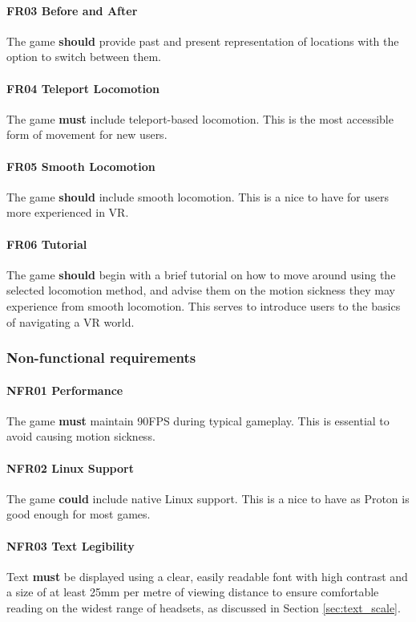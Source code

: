 \documentclass[sigconf,authordraft]{acmart}
\begin{document}
\paragraph{FR03 Before and After}
The game \textbf{should} provide past and present representation of locations
with the option to switch between them.

\paragraph{FR04 Teleport Locomotion}
The game \textbf{must} include teleport-based locomotion. This is the most
accessible form of movement for new users.

\paragraph{FR05 Smooth Locomotion}
The game \textbf{should} include smooth locomotion. This is a nice to have for
users more experienced in VR.

\paragraph{FR06 Tutorial}
The game \textbf{should} begin with a brief tutorial on how to move around
using the selected locomotion method, and advise them on the motion sickness
they may experience from smooth locomotion. This serves to introduce users to
the basics of navigating a VR world.

\subsubsection{Non-functional requirements}

\paragraph{\label{sec:nfr_performance}NFR01 Performance}
The game \textbf{must} maintain 90FPS during typical gameplay. This is essential
to avoid causing motion sickness.

\paragraph{NFR02 Linux Support}
The game \textbf{could} include native Linux support. This is a nice to have as
Proton is good enough for most games.

\paragraph{NFR03 Text Legibility}
Text \textbf{must} be displayed using a clear, easily readable font with high
contrast and a size of at least 25mm per metre of viewing distance to ensure
comfortable reading on the widest range of headsets, as discussed in Section
\ref{sec:text_scale}.
\end{document}
